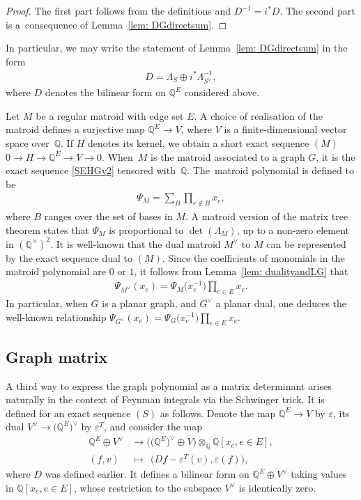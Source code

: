 \documentclass[pdftex]{sigma}%
\numberwithin{equation}{section}
\newcommand{\To}{\longrightarrow}
\newcommand{\Q}{\mathbb Q}
\newcommand{\0}{\color{blue}{\mathsf{0}}}
\begin{document}
 \begin{proof} The first part follows from the definitions and $D^{-1} = i^* D$. The second part is a~consequence of
 Lemma~\ref{lem: DGdirectsum}.
\end{proof}

In particular, we may write the statement of Lemma~\ref{lem: DGdirectsum} in the form
 \begin{gather} \label{DdecompSdualS}
 D = \Lambda_S \oplus i^* \Lambda_{S^{\vee}}^{-1},
 \end{gather}
 where $D$ denotes the bilinear form on $\Q^E$ considered above.

 \begin{rem}
 Let $M$ be a regular matroid with edge set $E$. A choice of realisation of the matroid defines a surjective map
 $\Q^E \rightarrow V$, where $V$ is a finite-dimensional vector space over~$\Q$. If $H$ denotes its kernel, we obtain a short exact sequence $(M)$
 $0 \rightarrow H \rightarrow \Q^E \rightarrow V \rightarrow 0$.
 When~$M$ is the matroid associated to a graph $G$, it is the exact sequence \eqref{SEHGv2} tensored with~$\Q$.
 The~matroid polynomial is defined to be
 \begin{gather*}
 \Psi_M = \sum_{B} \prod_{e \notin B} x_e,
 \end{gather*}
 where $B$ ranges over the set of bases in $M$. A matroid version of the matrix tree theorem \cite{DSWmatroid, Maurer}
 states that $\Psi_M$ is proportional to $\det(\Lambda_M)$, up to a non-zero element in $(\Q^{\times})^2$.
 It is well-known that the dual matroid $M^{\vee}$ to $M$ can be represented by the exact sequence dual to $(M)$.
Since the coefficients of monomials in the matroid polynomial are $0$ or $1$, it follows from Lemma~\ref{lem: dualityandLG} that
\begin{gather*}
\Psi_{M^{\vee}}(x_e) = \Psi_{M} \big(x_{e}^{-1}\big) \prod_{e \in E} x_e .
\end{gather*}
 In particular, when $G$ is a planar graph, and $G^{\vee}$ a planar dual, one deduces the well-known relationship $\Psi_{G^{\vee}}(x_e) = \Psi_{G} \big(x_{e}^{-1}\big) \prod_{e \in E} x_e$.
\end{rem}


\subsection{Graph matrix} \label{sect: GraphMatrix}
A third way to express the graph polynomial as a matrix determinant arises naturally in the context of Feynman integrals via the Schwinger trick.
It is defined for an exact sequence $(S)$ as follows. Denote the map $\Q^E \rightarrow V$ by $\varepsilon$, its dual $V^{\vee} \rightarrow \big(\Q^E\big)^{\vee}$ by $\varepsilon^T$, and consider the map \begin{align*}
\Q^E \oplus V^{\vee} &\To \big(\big(\Q^E\big)^{\vee} \oplus V \big)\otimes_{\Q} \Q[x_e, e\in E],
\\
( f, v) &\mapsto \ \ \big(Df - \varepsilon^{T}(v), \varepsilon(f)\big),
 \end{align*}
 where $D$ was defined earlier. It defines a bilinear form on $\Q^E\oplus V^{\vee}$ taking values in $\Q[x_e, e\in E]$, whose restriction to the subspace $V^{\vee}$ is identically zero.
\end{document}
